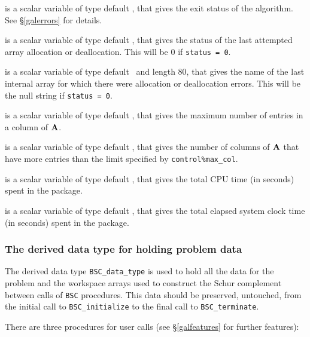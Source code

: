 \documentclass{galahad}
\newcommand{\packagename}{BSC}
\begin{document}
\begin{description}

 is a scalar variable of type default \integer, that gives the
exit status of the algorithm. 
See \S\ref{galerrors} 
for details.

 is a scalar variable of type default \integer, that gives
the status of the last attempted array allocation or deallocation.
This will be 0 if {\tt status = 0}.

 is a scalar variable of type default \character\
and length 80, that  gives the name of the last internal array 
for which there were allocation or deallocation errors.
This will be the null string if {\tt status = 0}. 

 is a scalar variable of type default \integer, that gives
 the maximum number of entries in a column of ${\mathbf{A}}$.

 is a scalar variable of type default \integer, that 
 gives the number of columns of ${\mathbf{A}}$ that have more entries than the limit
 specified by {\tt control\%max\_col}.

 is a scalar variable of type default \realdp, that gives
 the total CPU time (in seconds) spent in the package.

 is a scalar variable of type default \realdp, that gives
 the total elapsed system clock time (in seconds) spent in the package.

\end{description}


\subsubsection{The derived data type for holding problem data}\label{typedata}
The derived data type
{\tt \packagename\_data\_type} 
is used to hold all the data for the problem and the workspace arrays 
used to construct the Schur complement between calls of 
{\tt \packagename} procedures. 
This data should be preserved, untouched, from the initial call to 
{\tt \packagename\_initialize}
to the final call to
{\tt \packagename\_terminate}.


\galarguments
There are three procedures for user calls
(see \S\ref{galfeatures} for further features): 
\end{document}
